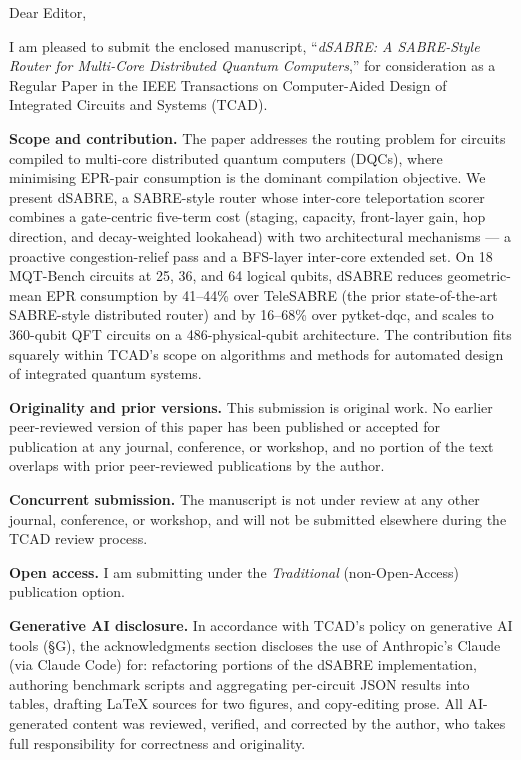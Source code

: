 \documentclass[11pt]{letter}
\begin{document}
\begin{letter}{}

\opening{Dear Editor,}

I am pleased to submit the enclosed manuscript, ``\emph{dSABRE: A
SABRE-Style Router for Multi-Core Distributed Quantum Computers},''
for consideration as a Regular Paper in the IEEE Transactions on
Computer-Aided Design of Integrated Circuits and Systems (TCAD).

\noindent\textbf{Scope and contribution.}
The paper addresses the routing problem for circuits compiled to
multi-core distributed quantum computers (DQCs), where minimising
EPR-pair consumption is the dominant compilation objective.  We
present dSABRE, a SABRE-style router whose inter-core teleportation
scorer combines a gate-centric five-term cost (staging, capacity,
front-layer gain, hop direction, and decay-weighted lookahead) with
two architectural mechanisms --- a proactive congestion-relief pass
and a BFS-layer inter-core extended set.  On 18 MQT-Bench circuits
at 25, 36, and 64 logical qubits, dSABRE reduces geometric-mean EPR
consumption by 41--44\% over TeleSABRE (the prior state-of-the-art
SABRE-style distributed router) and by 16--68\% over pytket-dqc, and
scales to 360-qubit QFT circuits on a 486-physical-qubit
architecture.  The contribution fits squarely within TCAD's scope on
algorithms and methods for automated design of integrated quantum
systems.

\noindent\textbf{Originality and prior versions.}
This submission is original work.  No earlier peer-reviewed version
of this paper has been published or accepted for publication at any
journal, conference, or workshop, and no portion of the text overlaps
with prior peer-reviewed publications by the author.

\noindent\textbf{Concurrent submission.}
The manuscript is not under review at any other journal, conference,
or workshop, and will not be submitted elsewhere during the TCAD
review process.

\noindent\textbf{Open access.}
I am submitting under the \emph{Traditional} (non-Open-Access)
publication option.

\noindent\textbf{Generative AI disclosure.}
In accordance with TCAD's policy on generative AI tools (§G), the
acknowledgments section discloses the use of Anthropic's Claude
(via Claude Code) for: refactoring portions of the dSABRE
implementation, authoring benchmark scripts and aggregating
per-circuit JSON results into tables, drafting LaTeX sources for two
figures, and copy-editing prose.  All AI-generated content was
reviewed, verified, and corrected by the author, who takes full
responsibility for correctness and originality.


\end{letter}
\end{document}
